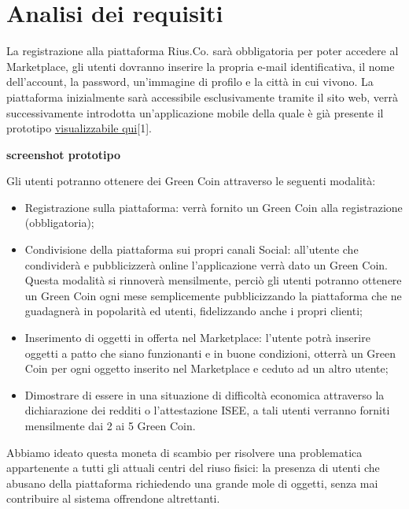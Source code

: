 \section{Analisi dei requisiti}
La registrazione alla piattaforma Rius.Co. sarà obbligatoria per poter accedere al Marketplace, gli utenti dovranno inserire la propria e-mail identificativa, il nome dell'account, la password, un'immagine di profilo e la città in cui vivono. La piattaforma inizialmente sarà accessibile esclusivamente tramite il sito web, verrà successivamente introdotta un'applicazione mobile della quale è già presente il prototipo \href{https://mauro886267.invisionapp.com/console/share/7Z10U19EHJ/476334736/play}{visualizzabile qui}[1]. 
\medskip

\textbf{screenshot prototipo}

Gli utenti potranno ottenere dei Green Coin attraverso le seguenti modalità:
\begin{itemize}
    \item 
    Registrazione sulla piattaforma: verrà fornito un Green Coin alla registrazione (obbligatoria);
    \item Condivisione della piattaforma sui propri canali Social: all’utente che condividerà e pubblicizzerà online l’applicazione verrà dato un Green Coin. Questa modalità si rinnoverà mensilmente, perciò gli utenti potranno ottenere un Green Coin ogni mese semplicemente pubblicizzando la piattaforma che ne guadagnerà in popolarità ed utenti, fidelizzando anche i propri clienti; 
    \item Inserimento di oggetti in offerta nel Marketplace: l’utente potrà inserire oggetti a patto che siano funzionanti e in buone condizioni, otterrà un Green Coin per ogni oggetto inserito nel Marketplace e ceduto ad un altro utente;
    \item Dimostrare di essere in una situazione di difficoltà economica attraverso la dichiarazione dei redditi o l’attestazione ISEE, a tali utenti verranno forniti mensilmente dai 2 ai 5 Green Coin.
\end{itemize}
Abbiamo ideato questa moneta di scambio per risolvere una problematica appartenente a tutti gli attuali centri del riuso fisici: la presenza di utenti che abusano della piattaforma richiedendo una grande mole di oggetti, senza mai contribuire al sistema offrendone altrettanti. 
\medskip

